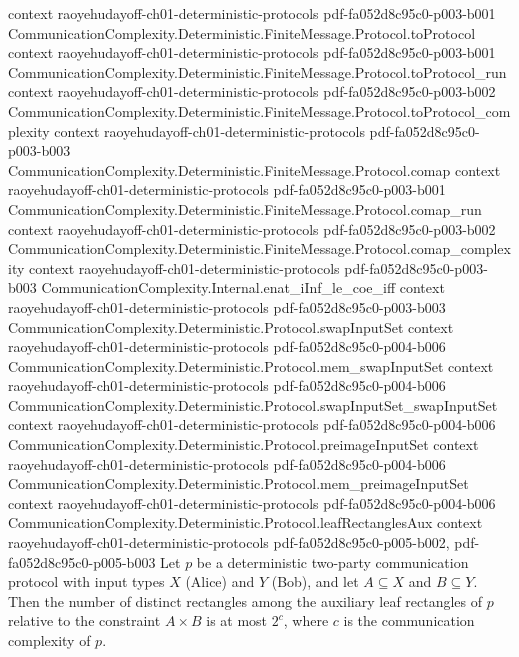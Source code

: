 \begin{lemma}
  {context}
  {raoyehudayoff-ch01-deterministic-protocols}
  {pdf-fa052d8c95c0-p003-b001}
\proofstep
  {CommunicationComplexity.Deterministic.FiniteMessage.Protocol.toProtocol}
  {context}
  {raoyehudayoff-ch01-deterministic-protocols}
  {pdf-fa052d8c95c0-p003-b001}
\proofstep
  {CommunicationComplexity.Deterministic.FiniteMessage.Protocol.toProtocol_run}
  {context}
  {raoyehudayoff-ch01-deterministic-protocols}
  {pdf-fa052d8c95c0-p003-b002}
\proofstep
  {CommunicationComplexity.Deterministic.FiniteMessage.Protocol.toProtocol_complexity}
  {context}
  {raoyehudayoff-ch01-deterministic-protocols}
  {pdf-fa052d8c95c0-p003-b003}
\proofstep
  {CommunicationComplexity.Deterministic.FiniteMessage.Protocol.comap}
  {context}
  {raoyehudayoff-ch01-deterministic-protocols}
  {pdf-fa052d8c95c0-p003-b001}
\proofstep
  {CommunicationComplexity.Deterministic.FiniteMessage.Protocol.comap_run}
  {context}
  {raoyehudayoff-ch01-deterministic-protocols}
  {pdf-fa052d8c95c0-p003-b002}
\proofstep
  {CommunicationComplexity.Deterministic.FiniteMessage.Protocol.comap_complexity}
  {context}
  {raoyehudayoff-ch01-deterministic-protocols}
  {pdf-fa052d8c95c0-p003-b003}
\proofstep
  {CommunicationComplexity.Internal.enat_iInf_le_coe_iff}
  {context}
  {raoyehudayoff-ch01-deterministic-protocols}
  {pdf-fa052d8c95c0-p003-b003}
\proofstep
  {CommunicationComplexity.Deterministic.Protocol.swapInputSet}
  {context}
  {raoyehudayoff-ch01-deterministic-protocols}
  {pdf-fa052d8c95c0-p004-b006}
\proofstep
  {CommunicationComplexity.Deterministic.Protocol.mem_swapInputSet}
  {context}
  {raoyehudayoff-ch01-deterministic-protocols}
  {pdf-fa052d8c95c0-p004-b006}
\proofstep
  {CommunicationComplexity.Deterministic.Protocol.swapInputSet_swapInputSet}
  {context}
  {raoyehudayoff-ch01-deterministic-protocols}
  {pdf-fa052d8c95c0-p004-b006}
\proofstep
  {CommunicationComplexity.Deterministic.Protocol.preimageInputSet}
  {context}
  {raoyehudayoff-ch01-deterministic-protocols}
  {pdf-fa052d8c95c0-p004-b006}
\proofstep
  {CommunicationComplexity.Deterministic.Protocol.mem_preimageInputSet}
  {context}
  {raoyehudayoff-ch01-deterministic-protocols}
  {pdf-fa052d8c95c0-p004-b006}
\proofstep
  {CommunicationComplexity.Deterministic.Protocol.leafRectanglesAux}
  {context}
  {raoyehudayoff-ch01-deterministic-protocols}
  {pdf-fa052d8c95c0-p005-b002,
    pdf-fa052d8c95c0-p005-b003}
Let $p$ be a deterministic two-party communication protocol with input types $X$ (Alice)
and $Y$ (Bob), and let $A \subseteq X$ and $B \subseteq Y$. Then the number of distinct
rectangles among the auxiliary leaf rectangles of $p$ relative to the constraint $A
\times B$ is at most $2^{c}$, where $c$ is the communication complexity of $p$.
\end{lemma}

